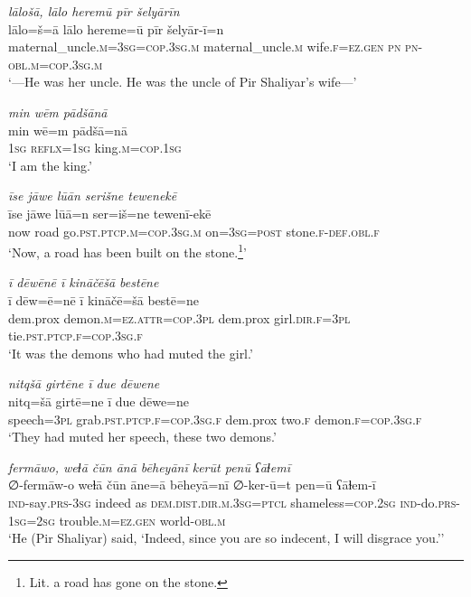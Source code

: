 \ea \label{ŽP.158}
\textit{lālošā, lālo heremū pīr šelyārīn} \\ 
\gll lālo=š=ā lālo hereme=ū pīr šelyār-ī=n \\ 
 maternal\_uncle\textsc{.m}\textsc{=3sg}\textsc{=cop}\textsc{.3sg}\textsc{.m} maternal\_uncle\textsc{.m} wife\textsc{.f}\textsc{\textsc{=ez.gen}} \textsc{pn} \textsc{pn}\textsc{-obl}\textsc{.m}\textsc{=cop}\textsc{.3sg}\textsc{.m} \\ 
\glt `—He was her uncle. He was the uncle of Pir Shaliyar’s wife—'
\z 
 
\ea \label{ŽP.160}
\textit{min wēm pādšānā} \\ 
\gll min wē=m pādšā=nā \\ 
 \textsc{1sg} \textsc{reflx}\textsc{=\textsc{1sg}} king\textsc{.m}\textsc{=cop}\textsc{.\textsc{1sg}} \\ 
\glt `I am the king.'
\z 
 
\ea \label{ŽP.170}
\textit{īse jāwe lūān serišne tewenekē} \\ 
\gll īse jāwe lūā=n ser=iš=ne tewenī-ekē \\ 
 now road go\textsc{.pst}\textsc{.ptcp}\textsc{.m}\textsc{=cop}\textsc{.3sg}\textsc{.m} on\textsc{=3sg}\textsc{=\textsc{post}} stone\textsc{.f}\textsc{-def}\textsc{.obl}\textsc{.f} \\ 
\glt `Now, a road has been built on the stone.\footnote{Lit. a road has gone on the stone.}'
\z 
 
\ea \label{ŽP.177}
\textit{ī dēwēnē ī kināčēšā bestēne} \\ 
\gll ī dēw=ē=nē ī kināčē=šā bestē=ne \\ 
 dem.prox demon\textsc{.m}\textsc{=ez}.\textsc{attr}\textsc{=cop}\textsc{.3pl} dem.prox girl\textsc{.dir}\textsc{.f}\textsc{=3pl} tie\textsc{.pst}\textsc{.ptcp}\textsc{.f}\textsc{=cop}\textsc{.3sg}\textsc{.f} \\ 
\glt `It was the demons who had muted the girl.'
\z 
 
\ea \label{ŽP.178}
\textit{nitqšā girtēne ī due dēwene} \\ 
\gll nitq=šā girtē=ne ī due dēwe=ne \\ 
 speech\textsc{=3pl} grab\textsc{.pst}\textsc{.ptcp}\textsc{.f}\textsc{=cop}\textsc{.3sg}\textsc{.f} dem.prox two\textsc{.f} demon\textsc{.f}\textsc{=cop}\textsc{.3sg}\textsc{.f} \\ 
\glt `They had muted her speech, these two demons.'
\z 
 
\ea \label{ŽP.198}
\textit{fermāwo, weɫā čūn ānā bēheyānī kerūt penū ʕāɫemī} \\ 
\gll ∅-fermāw-o weɫā čūn āne=ā bēheyā=nī ∅-ker-ū=t pen=ū ʕāɫem-ī \\ 
 \textsc{ind-}say\textsc{.prs}\textsc{-3sg} indeed as \textsc{dem.dist}\textsc{.dir}\textsc{.m}\textsc{.3sg}=\textsc{ptcl} shameless\textsc{=cop}\textsc{.\textsc{2sg}} \textsc{ind-}do\textsc{.prs}\textsc{-\textsc{1sg}}\textsc{=\textsc{2sg}} trouble\textsc{.m}\textsc{\textsc{=ez.gen}} world\textsc{-obl}\textsc{.m} \\ 
\glt `He (Pir Shaliyar) said, ‘Indeed, since you are so indecent, I will disgrace you.’'
\z 
 

